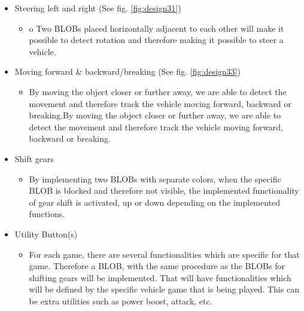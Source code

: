 \begin{itemize}
\item Steering left and right (See fig. \ref{fig:design31})
	\begin{itemize}
	\item o	Two BLOBs placed horizontally adjacent to each other will make it possible to detect rotation and therefore making it possible to steer a vehicle.
	\end{itemize}
	
\item Moving forward \& backward/breaking (See fig. \ref{fig:design33})
	\begin{itemize}
	\item By moving the object closer or further away, we are able to detect the movement and therefore track the vehicle moving forward, backward or breaking.By moving the object closer or further away, we are able to detect the movement and therefore track the vehicle moving forward, backward or breaking.
	\end{itemize}
	
\item Shift gears
	\begin{itemize}
	\item By implementing two BLOBs with separate colors, when the specific BLOB is blocked and therefore not visible, the implemented functionality of gear shift is activated, up or down depending on the implemented functions.
	\end{itemize}
	
\item Utility Button(s)
	\begin{itemize}
	\item For each game, there are several functionalities which are specific for that game. Therefore a BLOB, with the same procedure as the BLOBs for shifting gears will be implemented.  That will have functionalities which will be defined by the specific vehicle game that is being played. This can be extra utilities such as power boost, attack, etc.
	\end{itemize}
\end{itemize}


